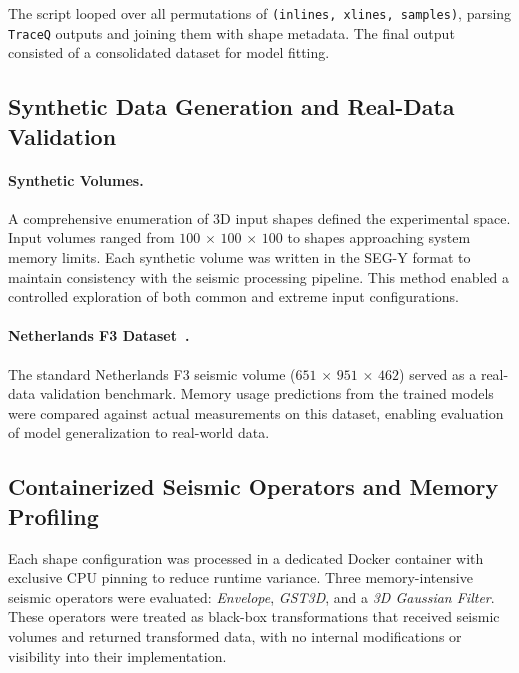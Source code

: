 The script looped over all permutations of \texttt{(inlines, xlines, samples)}, parsing \texttt{TraceQ} outputs and joining them with shape metadata.
The final output consisted of a consolidated dataset for model fitting.

\subsection{Synthetic Data Generation and Real-Data Validation}
\label{subsec:pmc-synthetic-data-generation-and-real-data-validation}

\paragraph{Synthetic Volumes.}
A comprehensive enumeration of \ac{3D} input shapes defined the experimental space.
Input volumes ranged from $100$ $\times$ $100$ $\times$ $100$ to shapes approaching system memory limits.
Each synthetic volume was written in the \ac{SEG-Y} format to maintain consistency with the seismic processing pipeline.
This method enabled a controlled exploration of both common and extreme input configurations.

\paragraph{Netherlands F3 Dataset~\cite{f3dataset}.}
The standard Netherlands F3 seismic volume ($651$ $\times$ $951$ $\times$ $462$) served as a real-data validation benchmark.
Memory usage predictions from the trained models were compared against actual measurements on this dataset, enabling evaluation of model generalization to real-world data.

\subsection{Containerized Seismic Operators and Memory Profiling}
\label{subsec:containerized-seismic-operators-and-memory-profiling}

Each shape configuration was processed in a dedicated Docker container with exclusive \ac{CPU} pinning to reduce runtime variance.
Three memory-intensive seismic operators were evaluated: \emph{Envelope}, \emph{\ac{GST3D}}, and a \emph{3D Gaussian Filter}.
These operators were treated as black-box transformations that received seismic volumes and returned transformed data, with no internal modifications or visibility into their implementation.

